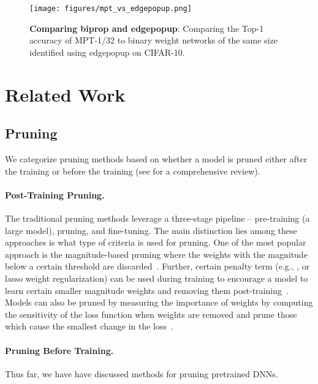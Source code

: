 \documentclass{article} \usepackage{iclr2021_conference,times}
\begin{document}
\begin{figure}[h]
    \centering
    \texttt{[image: figures/mpt\_vs\_edgepopup.png]}
    \caption{{\bfseries Comparing biprop and edgepopup}: Comparing the Top-1 accuracy of MPT-1/32 to binary weight networks of the same size identified using edgepopup on CIFAR-10.}
    \label{fig:mpt-vs-edgepopup}
\end{figure}


\section{Related Work}
\label{sec:relatedwork}
\subsection{Pruning}
We categorize pruning methods based on whether a model is pruned either after the training or before the training (see \citep{cheng2017survey} for a comprehensive review).

\paragraph{Post-Training Pruning.}
The traditional pruning methods leverage a three-stage pipeline -- pre-training  (a large model), pruning, and fine-tuning. The main distinction lies among these approaches is what type of criteria is used for pruning. 
One of the most popular approach is the magnitude-based pruning where the weights with the magnitude below a certain threshold are discarded~\citep{hagiwara1993removal}.
Further, certain penalty term (e.g., ,  or lasso weight regularization) can be used during training to encourage a model to learn certain smaller magnitude weights and removing them post-training~\citep{weigend1991generalization}. 
Models can also be pruned by measuring the importance of weights by computing the sensitivity of the loss function when weights are removed and prune those which cause the smallest change in the loss~\citep{lecun1990optimal}. 


\paragraph{Pruning Before Training.}

Thus far, we have have discussed methods for pruning pretrained DNNs. 
\end{document}
